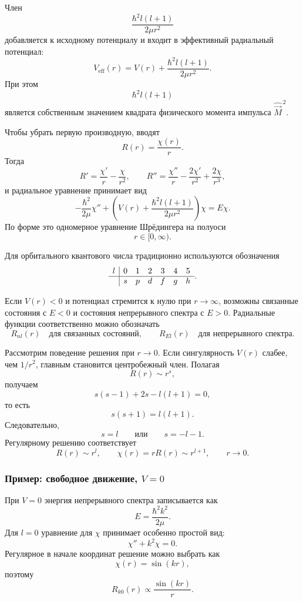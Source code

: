 \documentclass[12pt,a4paper]{article}
\begin{document}
Член
\[
    \frac{\hbar^2l(l+1)}{2\mu r^2}
\]
добавляется к исходному потенциалу и входит в эффективный радиальный
потенциал:
\[
    \boxed{
        V_{\mathrm{eff}}(r)
        =
        V(r)+
        \frac{\hbar^2l(l+1)}{2\mu r^2}
    }.
\]
При этом
\[
    \hbar^2l(l+1)
\]
является собственным значением квадрата физического момента импульса
$\hat{\vec M}^{\,2}$.

Чтобы убрать первую производную, вводят
\[
    R(r)=\frac{\chi(r)}{r}.
\]
Тогда
\[
    R'
    =
    \frac{\chi'}{r}
    -
    \frac{\chi}{r^2},
    \qquad
    R''
    =
    \frac{\chi''}{r}
    -
    \frac{2\chi'}{r^2}
    +
    \frac{2\chi}{r^3},
\]
и радиальное уравнение принимает вид
\[
    \boxed{
    -\frac{\hbar^2}{2\mu}\chi''
    +
    \left(
        V(r)+
        \frac{\hbar^2l(l+1)}{2\mu r^2}
    \right)\chi
    =
    E\chi
    }.
\]
По форме это одномерное уравнение Шрёдингера на полуоси
\[
    r\in[0,\infty).
\]

Для орбитального квантового числа традиционно используются обозначения
\[
    \begin{array}{c|cccccc}
        l & 0 & 1 & 2 & 3 & 4 & 5 \\ \hline
          & s & p & d & f & g & h
    \end{array}.
\]

Если $V(r)<0$ и потенциал стремится к нулю при $r\to\infty$, возможны
связанные состояния с $E<0$ и состояния непрерывного спектра с $E>0$.
Радиальные функции соответственно можно обозначать
\[
    R_{nl}(r)
    \quad\text{для связанных состояний},
    \qquad
    R_{El}(r)
    \quad\text{для непрерывного спектра}.
\]

Рассмотрим поведение решения при $r\to0$. Если сингулярность $V(r)$
слабее, чем $1/r^2$, главным становится центробежный член. Полагая
\[
    R(r)\sim r^s,
\]
получаем
\[
    s(s-1)+2s-l(l+1)=0,
\]
то есть
\[
    s(s+1)=l(l+1).
\]
Следовательно,
\[
    s=l
    \qquad\text{или}\qquad
    s=-l-1.
\]
Регулярному решению соответствует
\[
    \boxed{
        R(r)\sim r^l,
        \qquad
        \chi(r)=rR(r)\sim r^{l+1},
        \qquad
        r\to0
    }.
\]


\subsubsection{Пример: свободное движение, \texorpdfstring{$V=0$}{V=0}}

При $V=0$ энергия непрерывного спектра записывается как
\[
    \boxed{
        E=\frac{\hbar^2k^2}{2\mu}
    }.
\]
Для $l=0$ уравнение для $\chi$ принимает особенно простой вид:
\[
    \chi''+k^2\chi=0.
\]
Регулярное в начале координат решение можно выбрать как
\[
    \chi(r)=\sin(kr),
\]
поэтому
\[
    R_{k0}(r)\propto\frac{\sin(kr)}{r}.
\]
\end{document}

